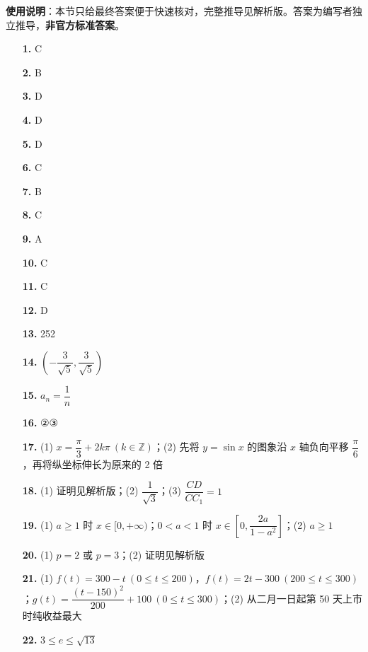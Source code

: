 
\begin{gknotice}
\textbf{使用说明}：本节只给最终答案便于快速核对，完整推导见解析版。答案为编写者独立推导，\textbf{非官方标准答案}。
\end{gknotice}

\begin{itemize}[leftmargin=2.6em]
  \item[\textbf{1.}] C
  \item[\textbf{2.}] B
  \item[\textbf{3.}] D
  \item[\textbf{4.}] D
  \item[\textbf{5.}] D
  \item[\textbf{6.}] C
  \item[\textbf{7.}] B
  \item[\textbf{8.}] C
  \item[\textbf{9.}] A
  \item[\textbf{10.}] C
  \item[\textbf{11.}] C
  \item[\textbf{12.}] D
  \item[\textbf{13.}] 252
  \item[\textbf{14.}] $\left(-\dfrac3{\sqrt5},\dfrac3{\sqrt5}\right)$
  \item[\textbf{15.}] $a_n=\dfrac1n$
  \item[\textbf{16.}] ②③
  \item[\textbf{17.}] (1) $x=\dfrac\pi3+2k\pi\ (k\in\mathbb Z)$；(2) 先将 $y=\sin x$ 的图象沿 $x$ 轴负向平移 $\dfrac\pi6$，再将纵坐标伸长为原来的 2 倍
  \item[\textbf{18.}] (1) 证明见解析版；(2) $\dfrac1{\sqrt3}$；(3) $\dfrac{CD}{CC_1}=1$
  \item[\textbf{19.}] (1) $a\ge1$ 时 $x\in[0,+\infty)$；$0<a<1$ 时 $x\in\left[0,\dfrac{2a}{1-a^2}\right]$；(2) $a\ge1$
  \item[\textbf{20.}] (1) $p=2$ 或 $p=3$；(2) 证明见解析版
  \item[\textbf{21.}] (1) $f(t)=300-t\ (0\le t\le200)$，$f(t)=2t-300\ (200\le t\le300)$；$g(t)=\dfrac{(t-150)^2}{200}+100\ (0\le t\le300)$；(2) 从二月一日起第 50 天上市时纯收益最大
  \item[\textbf{22.}] $3\le e\le\sqrt{13}$
\end{itemize}
